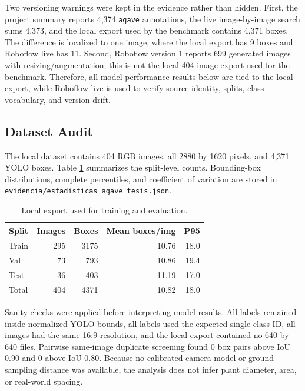 \documentclass[10pt,twocolumn]{article}
\begin{document}
Two versioning warnings were kept in the evidence rather than hidden. First, the project summary reports 4,374 \texttt{agave} annotations, the live image-by-image search sums 4,373, and the local export used by the benchmark contains 4,371 boxes. The difference is localized to one image, where the local export has 9 boxes and Roboflow live has 11. Second, Roboflow version 1 reports 699 generated images with resizing/augmentation; this is not the local 404-image export used for the benchmark. Therefore, all model-performance results below are tied to the local export, while Roboflow live is used to verify source identity, splits, class vocabulary, and version drift.

\subsection{Dataset Audit}

The local dataset contains 404 RGB images, all 2880 by 1620 pixels, and 4,371 YOLO boxes. Table \ref{tab:dataset} summarizes the split-level counts. Bounding-box distributions, complete percentiles, and coefficient of variation are stored in \texttt{evidencia/estadisticas\_agave\_tesis.json}.

\begin{table}[t]
\centering
\caption{Local export used for training and evaluation.}
\label{tab:dataset}
\begin{tabular}{lrrrr}
\toprule
Split & Images & Boxes & Mean boxes/img & P95 \\
\midrule
Train & 295 & 3175 & 10.76 & 18.0 \\
Val & 73 & 793 & 10.86 & 19.4 \\
Test & 36 & 403 & 11.19 & 17.0 \\
\midrule
Total & 404 & 4371 & 10.82 & 18.0 \\
\bottomrule
\end{tabular}
\end{table}

Sanity checks were applied before interpreting model results. All labels remained inside normalized YOLO bounds, all labels used the expected single class ID, all images had the same 16:9 resolution, and the local export contained no 640 by 640 files. Pairwise same-image duplicate screening found 0 box pairs above IoU 0.90 and 0 above IoU 0.80. Because no calibrated camera model or ground sampling distance was available, the analysis does not infer plant diameter, area, or real-world spacing.
\end{document}

